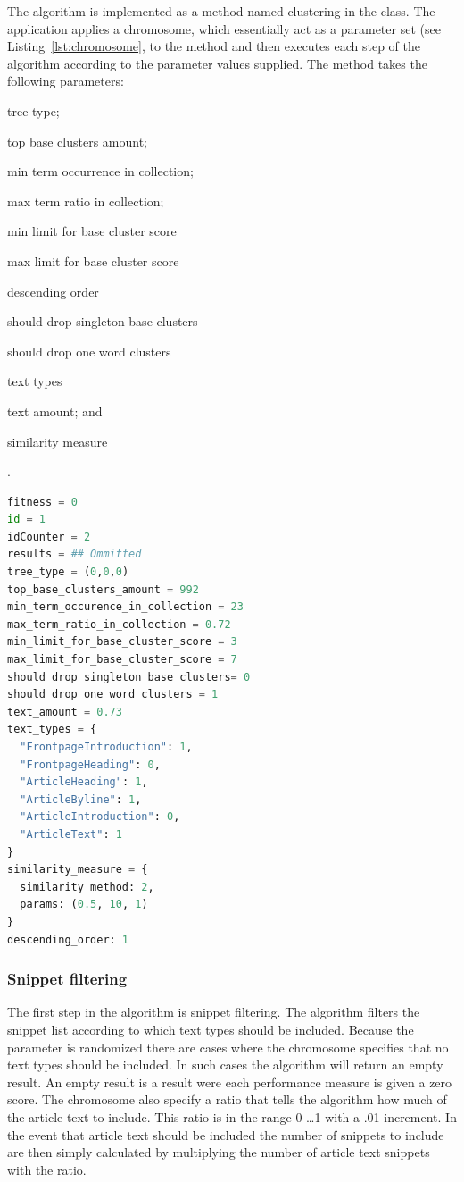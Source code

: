 The \CTC algorithm is implemented as a method named clustering in the \CTC class. The application applies a chromosome, which essentially act as a parameter set (see Listing~\ref{lst:chromosome}, to the method and then executes each step of the \CTC algorithm according to the parameter values supplied. The method takes the following parameters:
\begin{inparaenum}[\itshape 1\upshape)]
\item tree type;
\item top base clusters amount;
\item min term occurrence in collection;
\item max term ratio in collection;
\item min limit for base cluster score
\item max limit for base cluster score
\item descending order
\item should drop singleton base clusters
\item should drop one word clusters
\item text types
\item text amount; and
\item similarity measure
\end{inparaenum}.

\begin{lstlisting}[float=ht, language=python, label=lst:chromosome, caption={An example chromosome}]
fitness = 0
id = 1
idCounter = 2
results = ## Ommitted
tree_type = (0,0,0)
top_base_clusters_amount = 992
min_term_occurence_in_collection = 23
max_term_ratio_in_collection = 0.72
min_limit_for_base_cluster_score = 3
max_limit_for_base_cluster_score = 7
should_drop_singleton_base_clusters= 0
should_drop_one_word_clusters = 1
text_amount = 0.73
text_types = {
  "FrontpageIntroduction": 1,
  "FrontpageHeading": 0,
  "ArticleHeading": 1,
  "ArticleByline": 1,
  "ArticleIntroduction": 0,
  "ArticleText": 1
}
similarity_measure = {
  similarity_method: 2,
  params: (0.5, 10, 1)
}
descending_order: 1
\end{lstlisting}

\subsubsection{Snippet filtering}
The first step in the \CTC algorithm is snippet filtering. The algorithm filters the snippet list according to which text types should be included. Because the parameter is randomized there are cases where the chromosome specifies that no text types should be included. In such cases the algorithm will return an empty result. An empty result is a result were each performance measure is given a zero score. The chromosome also specify a ratio that tells the algorithm how much of the article text to include. This ratio is in the range 0 \dots 1 with a .01 increment. In the event that article text should be included the number of snippets to include are then simply calculated by multiplying the number of article text snippets with the ratio.

